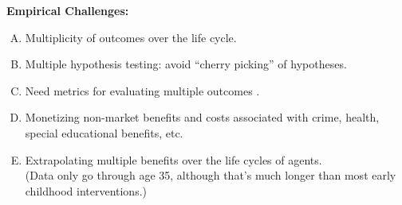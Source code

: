 \documentclass[static]{JJH-Beamer}
\begin{document}
\begin{frame}

\begin{center}
\textbf{Empirical Challenges:}
\end{center}

\begin{enumerate}[(A)]
\item Multiplicity of outcomes over the life cycle.
\item Multiple hypothesis testing: avoid ``cherry picking'' of hypotheses.
\item Need metrics for evaluating multiple outcomes .
\item Monetizing non-market benefits and costs associated with crime, health, special educational benefits, etc.
\item Extrapolating multiple benefits over the life cycles of agents. \\(Data only go through age 35, although that's much longer than most early childhood interventions.)
\end{enumerate}

\end{frame}
\end{document}
